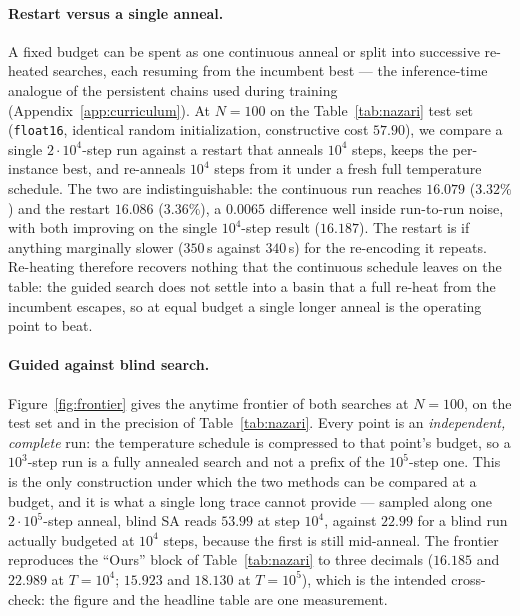 \documentclass[letterpaper]{article} %
\begin{document}
\paragraph{Restart versus a single anneal.}
A fixed budget can be spent as one continuous anneal or split into successive re-heated searches, each resuming from the incumbent best --- the inference-time analogue of the persistent chains used during training (Appendix~\ref{app:curriculum}). At $N = 100$ on the Table~\ref{tab:nazari} test set (\texttt{float16}, identical random initialization, constructive cost $57.90$), we compare a single $2\cdot10^{4}$-step run against a restart that anneals $10^{4}$ steps, keeps the per-instance best, and re-anneals $10^{4}$ steps from it under a fresh full temperature schedule. The two are indistinguishable: the continuous run reaches $16.079$ ($3.32\%$) and the restart $16.086$ ($3.36\%$), a $0.0065$ difference well inside run-to-run noise, with both improving on the single $10^{4}$-step result ($16.187$). The restart is if anything marginally slower ($350$\,s against $340$\,s) for the re-encoding it repeats. Re-heating therefore recovers nothing that the continuous schedule leaves on the table: the guided search does not settle into a basin that a full re-heat from the incumbent escapes, so at equal budget a single longer anneal is the operating point to beat.

\paragraph{Guided against blind search.}
Figure~\ref{fig:frontier} gives the anytime frontier of both searches at $N = 100$, on the test set and in the precision of Table~\ref{tab:nazari}. Every point is an \emph{independent, complete} run: the temperature schedule is compressed to that point's budget, so a $10^{3}$-step run is a fully annealed search and not a prefix of the $10^{5}$-step one. This is the only construction under which the two methods can be compared at a budget, and it is what a single long trace cannot provide --- sampled along one $2 \cdot 10^{5}$-step anneal, blind SA reads $53.99$ at step $10^{4}$, against $22.99$ for a blind run actually budgeted at $10^{4}$ steps, because the first is still mid-anneal. The frontier reproduces the ``Ours'' block of Table~\ref{tab:nazari} to three decimals ($16.185$ and $22.989$ at $T = 10^{4}$; $15.923$ and $18.130$ at $T = 10^{5}$), which is the intended cross-check: the figure and the headline table are one measurement.
\end{document}
